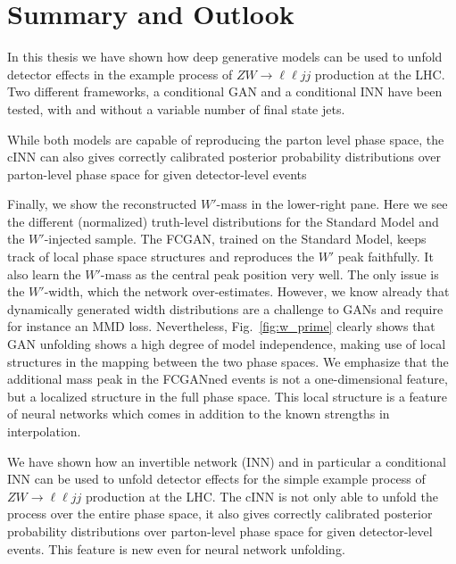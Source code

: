 %
%
%

\chapter{Summary and Outlook}\label{chap:summ}
\enlargethispage{2ex}
\vspace*{-2pt}

In this thesis we have shown how deep generative models can be used to unfold detector effects in the example process of $ZW \to \ell \ell jj$ production at the LHC. Two different frameworks, a conditional GAN and a conditional INN have been tested, with and without a variable number of final state jets.

While both models are capable of reproducing the parton level phase space, 
the cINN can also gives correctly calibrated posterior probability
distributions over parton-level phase space for given detector-level
events

Finally, we show the reconstructed $W'$-mass in the lower-right
pane. Here we see the different (normalized) truth-level distributions
for the Standard Model and the $W'$-injected sample. The FCGAN,
trained on the Standard Model, keeps track of local phase space
structures and reproduces the $W'$ peak faithfully. It also learn the
$W'$-mass as the central peak position very well. The only issue is
the $W'$-width, which the network over-estimates. However, we know
already that dynamically generated width distributions are a challenge
to GANs and require for instance an MMD loss.  Nevertheless,
Fig.~\ref{fig:w_prime} clearly shows that GAN unfolding shows a high
degree of model independence, making use of local structures in the
mapping between the two phase spaces. We emphasize that the additional
mass peak in the FCGANned events is not a one-dimensional feature, but
a localized structure in the full phase space. This local structure is
a feature of neural networks which comes in addition to the known
strengths in interpolation.

We have shown how an invertible network (INN) and in particular a
conditional INN can be used to unfold detector effects for the simple
example process of $ZW \to \ell \ell jj$ production at the LHC. The
cINN is not only able to unfold the process over the entire phase
space, it also gives correctly calibrated posterior probability
distributions over parton-level phase space for given detector-level
events. This feature is new even for neural network unfolding.

